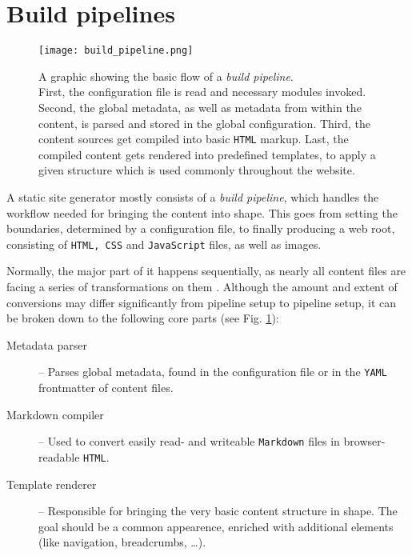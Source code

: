 \section{Build pipelines}
\label{sec:buildpipelines}

\begin{figure} %
    \centering
    \texttt{[image: build\_pipeline.png]}
    \caption{A graphic showing the basic flow of a \emph{build pipeline}.\\
    First, the configuration file is read and necessary modules invoked. Second, the global metadata, as well as metadata from within the content, is parsed and stored in the global configuration. Third, the content sources get compiled into basic \texttt{HTML} markup. Last, the compiled content gets rendered into predefined templates, to apply a given structure which is used commonly throughout the website.}
    \label{fig:build-pipeline}
\end{figure}
%

A static site generator mostly consists of a \emph{build pipeline}, which handles the workflow needed for bringing the content into shape. This goes from setting the boundaries, determined by a configuration file, to finally producing a web root, consisting of \texttt{HTML, CSS} and \texttt{JavaScript} files, as well as images.

Normally, the major part of it happens sequentially, as nearly all content files are facing a series of transformations on them \cite{Metalsmith2015technicaldocumentation}. Although the amount and extent of conversions may differ significantly from pipeline setup to pipeline setup, it can be broken down to the following core parts (see Fig. \ref{fig:build-pipeline}):

\begin{description}
  \item[Metadata parser] -- Parses global metadata, found in the configuration file or in the \texttt{YAML} frontmatter of content files.
  \item[Markdown compiler] -- Used to convert easily read- and writeable \texttt{Markdown} files in browser-readable \texttt{HTML}.
  \item[Template renderer] -- Responsible for bringing the very basic content structure in shape. The goal should be a common appearence, enriched with additional elements (like navigation, breadcrumbs, \ldots).
\end{description}

